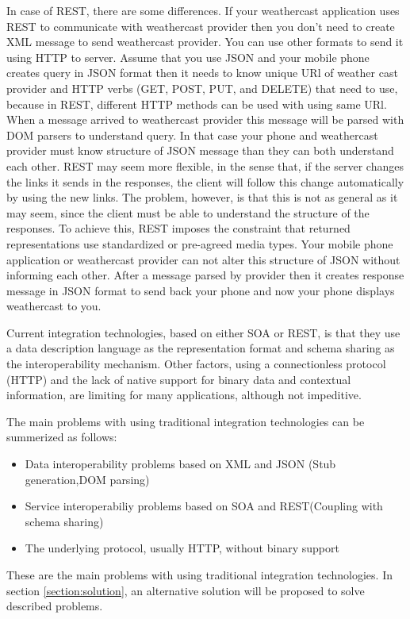 In case of REST, there are some differences. If your weathercast application uses REST to communicate with weathercast provider then you don’t need to create XML message to send weathercast provider. You can use other formats to send it using HTTP to server. Assume that you use JSON and your mobile phone creates query in JSON format then it needs to know unique URl of weather cast provider and HTTP verbs (GET, POST, PUT, and DELETE) that need to use, because in REST, different HTTP methods can be used with using same URl. When a message arrived to weathercast provider this message will be parsed with DOM parsers to understand query. In that case your phone and weathercast provider must know structure of JSON message than they can both understand each other. REST may seem more flexible, in the sense that, if the server changes the links it sends in the responses, the client will follow this change automatically by using the new links. The problem, however, is that this is not as general as it may seem, since the client must be able to understand the structure of the responses. To achieve this, REST imposes the constraint that returned representations use standardized or pre-agreed media types. Your mobile phone application or weathercast provider can not alter this structure of JSON without informing each other. After a message parsed by provider then it creates response message in JSON format to send back your phone and now your phone displays weathercast to you.

Current integration technologies, based on either SOA or REST, is that they use a data description language as the representation format and schema sharing as the interoperability mechanism. Other factors, using a connectionless protocol (HTTP) and the lack of native support for binary data and contextual information, are limiting for many applications, although not impeditive.

The main problems with using traditional integration technologies can be summerized as follows:
\begin{itemize}
  \item Data interoperability problems based on XML and JSON (Stub generation,DOM parsing)
  \item Service interoperabiliy problems based on SOA and REST(Coupling with schema sharing)
  \item The underlying protocol, usually HTTP, without binary support
\end{itemize}

These are the main problems with using traditional integration technologies. In section \ref{section:solution}, an alternative solution will be proposed to solve described problems.

